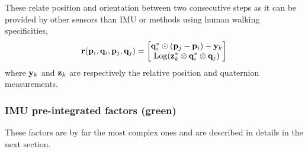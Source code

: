 These relate position and orientation between two consecutive steps as it can be provided by other sensors than IMU or methods using human walking specificities,
%
\begin{align}
{\bf r}({\bf p}_i,{\bf q}_i,{\bf p}_j,{\bf q}_j) = \begin{bmatrix}
{\bf q}_i^*\odot({\bf p}_j-{\bf p}_i) - {\bf y}_k \\
\operatorname*{Log}({\bf z}_k^*\otimes{\bf q}_i^*\otimes{\bf q}_j)
\end{bmatrix}
\end{align}
%
where ${\bf y}_k$ and ${\bf z}_k$ are respectively the relative position and quaternion measurements.

\subsubsection{IMU pre-integrated factors (green)}

These factors are by far the most complex ones and are described in details in the next section.
